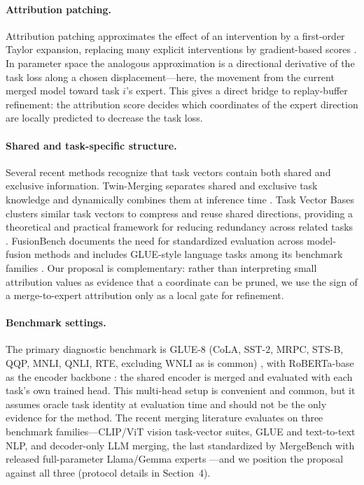 \documentclass[11pt]{article}
\begin{document}
\paragraph{Attribution patching.}
Attribution patching approximates the effect of an intervention by a first-order Taylor expansion, replacing many explicit interventions by gradient-based scores \citep{syed2024attributionpatching,kramar2024atpstar}. In parameter space the analogous approximation is a directional derivative of the task loss along a chosen displacement---here, the movement from the current merged model toward task $i$'s expert. This gives a direct bridge to replay-buffer refinement: the attribution score decides which coordinates of the expert direction are locally predicted to decrease the task loss.

\paragraph{Shared and task-specific structure.}
Several recent methods recognize that task vectors contain both shared and exclusive information. Twin-Merging separates shared and exclusive task knowledge and dynamically combines them at inference time \citep{lu2024twin}. Task Vector Bases clusters similar task vectors to compress and reuse shared directions, providing a theoretical and practical framework for reducing redundancy across related tasks \citep{zeng2025taskvectorbases}. FusionBench documents the need for standardized evaluation across model-fusion methods and includes GLUE-style language tasks among its benchmark families \citep{tang2024fusionbench}. Our proposal is complementary: rather than interpreting small attribution values as evidence that a coordinate can be pruned, we use the sign of a merge-to-expert attribution only as a local gate for refinement.

\paragraph{Benchmark settings.}
The primary diagnostic benchmark is GLUE-8 (CoLA, SST-2, MRPC, STS-B, QQP, MNLI, QNLI, RTE, excluding WNLI as is common) \citep{wang2018glue}, with RoBERTa-base as the encoder backbone \citep{liu2019roberta}: the shared encoder is merged and evaluated with each task's own trained head. This multi-head setup is convenient and common, but it assumes oracle task identity at evaluation time and should not be the only evidence for the method. The recent merging literature evaluates on three benchmark families---CLIP/ViT vision task-vector suites, GLUE and text-to-text NLP, and decoder-only LLM merging, the last standardized by MergeBench with released full-parameter Llama/Gemma experts \citep{radford2021clip,ilharco2022taskarithmetic,tang2024fusionbench,wang2019superglue,raffel2020t5,yu2023dare,he2025mergebench}---and we position the proposal against all three (protocol details in Section~4).
\end{document}
